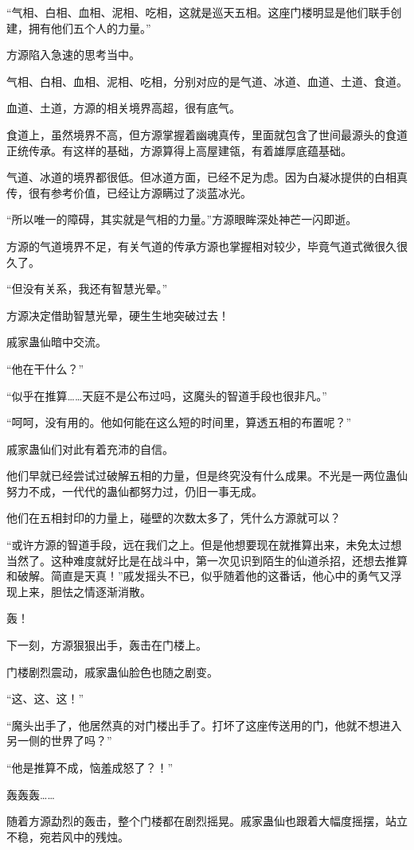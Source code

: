 \begin{this_body}
“气相、白相、血相、泥相、吃相，这就是巡天五相。这座门楼明显是他们联手创建，拥有他们五个人的力量。”

方源陷入急速的思考当中。

气相、白相、血相、泥相、吃相，分别对应的是气道、冰道、血道、土道、食道。

血道、土道，方源的相关境界高超，很有底气。

食道上，虽然境界不高，但方源掌握着幽魂真传，里面就包含了世间最源头的食道正统传承。有这样的基础，方源算得上高屋建瓴，有着雄厚底蕴基础。

气道、冰道的境界都很低。但冰道方面，已经不足为虑。因为白凝冰提供的白相真传，很有参考价值，已经让方源瞒过了淡蓝冰光。

“所以唯一的障碍，其实就是气相的力量。”方源眼眸深处神芒一闪即逝。

方源的气道境界不足，有关气道的传承方源也掌握相对较少，毕竟气道式微很久很久了。

“但没有关系，我还有智慧光晕。”

方源决定借助智慧光晕，硬生生地突破过去！

戚家蛊仙暗中交流。

“他在干什么？”

“似乎在推算……天庭不是公布过吗，这魔头的智道手段也很非凡。”

“呵呵，没有用的。他如何能在这么短的时间里，算透五相的布置呢？”

戚家蛊仙们对此有着充沛的自信。

他们早就已经尝试过破解五相的力量，但是终究没有什么成果。不光是一两位蛊仙努力不成，一代代的蛊仙都努力过，仍旧一事无成。

他们在五相封印的力量上，碰壁的次数太多了，凭什么方源就可以？

“或许方源的智道手段，远在我们之上。但是他想要现在就推算出来，未免太过想当然了。这种难度就好比是在战斗中，第一次见识到陌生的仙道杀招，还想去推算和破解。简直是天真！”戚发摇头不已，似乎随着他的这番话，他心中的勇气又浮现上来，胆怯之情逐渐消散。

轰！

下一刻，方源狠狠出手，轰击在门楼上。

门楼剧烈震动，戚家蛊仙脸色也随之剧变。

“这、这、这！”

“魔头出手了，他居然真的对门楼出手了。打坏了这座传送用的门，他就不想进入另一侧的世界了吗？”

“他是推算不成，恼羞成怒了？！”

轰轰轰……

随着方源勐烈的轰击，整个门楼都在剧烈摇晃。戚家蛊仙也跟着大幅度摇摆，站立不稳，宛若风中的残烛。


\end{this_body}
